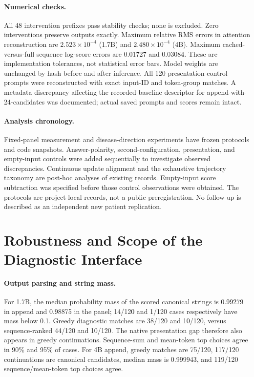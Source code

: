 \paragraph{Numerical checks.} All 48 intervention prefixes pass stability checks; none is excluded. Zero interventions preserve outputs exactly. Maximum relative RMS errors in attention reconstruction are $2.523\times10^{-4}$ (1.7B) and $2.480\times10^{-4}$ (4B). Maximum cached-versus-full sequence log-score errors are 0.01727 and 0.03084. These are implementation tolerances, not statistical error bars. Model weights are unchanged by hash before and after inference. All 120 presentation-control prompts were reconstructed with exact input-ID and token-group matches. A metadata discrepancy affecting the recorded baseline descriptor for append-with-24-candidates was documented; actual saved prompts and scores remain intact.

\paragraph{Analysis chronology.} Fixed-panel measurement and disease-direction experiments have frozen protocols and code snapshots. Answer-polarity, second-configuration, presentation, and empty-input controls were added sequentially to investigate observed discrepancies. Continuous update alignment and the exhaustive trajectory taxonomy are post-hoc analyses of existing records. Empty-input score subtraction was specified before those control observations were obtained. The protocols are project-local records, not a public preregistration. No follow-up is described as an independent new patient replication.

\section{Robustness and Scope of the Diagnostic Interface}
\label{app:robust}
\paragraph{Output parsing and string mass.} For 1.7B, the median probability mass of the scored canonical strings is 0.99279 in append and 0.98875 in the panel; 14/120 and 1/120 cases respectively have mass below 0.1. Greedy diagnostic matches are 38/120 and 10/120, versus sequence-ranked 44/120 and 10/120. The native presentation gap therefore also appears in greedy continuations. Sequence-sum and mean-token top choices agree in 90\% and 95\% of cases. For 4B append, greedy matches are 75/120, 117/120 continuations are canonical candidates, median mass is 0.999943, and 119/120 sequence/mean-token top choices agree.

